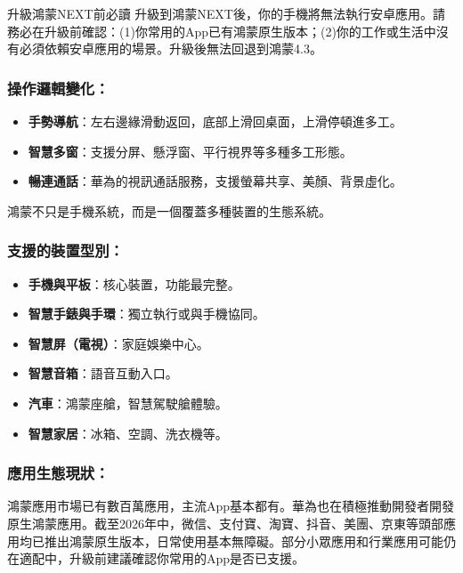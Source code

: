 \begin{tcbwarn}{升級鴻蒙NEXT前必讀}
升級到鴻蒙NEXT後，你的手機將無法執行安卓應用。請務必在升級前確認：(1)你常用的App已有鴻蒙原生版本；(2)你的工作或生活中沒有必須依賴安卓應用的場景。升級後無法回退到鴻蒙4.3。

\end{tcbwarn}

\subsubsection*{操作邏輯變化：}

\begin{itemize}
  \item \textbf{手勢導航}：左右邊緣滑動返回，底部上滑回桌面，上滑停頓進多工。
  \item \textbf{智慧多窗}：支援分屏、懸浮窗、平行視界等多種多工形態。
  \item \textbf{暢連通話}：華為的視訊通話服務，支援螢幕共享、美顏、背景虛化。
\end{itemize}


鴻蒙不只是手機系統，而是一個覆蓋多種裝置的生態系統。

\subsubsection*{支援的裝置型別：}

\begin{itemize}
  \item \textbf{手機與平板}：核心裝置，功能最完整。
  \item \textbf{智慧手錶與手環}：獨立執行或與手機協同。
  \item \textbf{智慧屏（電視）}：家庭娛樂中心。
  \item \textbf{智慧音箱}：語音互動入口。
  \item \textbf{汽車}：鴻蒙座艙，智慧駕駛艙體驗。
  \item \textbf{智慧家居}：冰箱、空調、洗衣機等。
\end{itemize}

\subsubsection*{應用生態現狀：}

鴻蒙應用市場已有數百萬應用，主流App基本都有。華為也在積極推動開發者開發原生鴻蒙應用。截至2026年中，微信、支付寶、淘寶、抖音、美團、京東等頭部應用均已推出鴻蒙原生版本，日常使用基本無障礙。部分小眾應用和行業應用可能仍在適配中，升級前建議確認你常用的App是否已支援。

